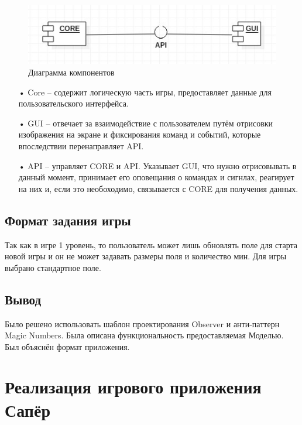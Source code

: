\begin{figure}[H]
	\begin{center}
		\includegraphics[scale=0.7]{images/diagram1.jpg}
		\caption{Диаграмма компонентов} 
		\label{pic:pic_name} %
	\end{center}
\end{figure}

\begin{enumerate}
\item[•] Core -- содержит логическую часть игры, предоставляет данные для пользовательского интерфейса.
\item[•] GUI -- отвечает за взаимодействие с пользователем путём отрисовки изображения на экране и фиксирования команд и событий, которые впоследствии перенаправляет API.
\item[•] API -- управляет CORE и API. Указывает GUI, что нужно отрисовывать в данный момент, принимает его оповещания о командах и сигнлах, реагирует на них и, если это необоходимо, связывается с CORE для получения данных. 
\end{enumerate}

\subsection{Формат задания игры}

Так как в игре 1 уровень, то пользователь может лишь обновлять поле для старта новой игры и он не может задавать размеры поля и количество мин. Для игры выбрано стандартное поле. 

\subsection{Вывод}

Было решено использовать шаблон проектирования Observer и анти-паттерн Magic Numbers. Была описана функциональность предоставляемая Моделью. Был объяснён формат приложения.

\section{Реализация игрового приложения Сапёр}

